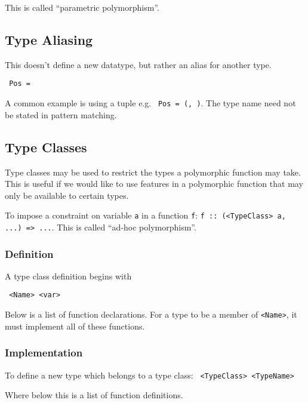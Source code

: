 This is called ``parametric polymorphism''.

\subsection{Type Aliasing}
This doesn't define a new datatype, but rather an alias for another type.
\begin{center}
  \texttt{ Pos = }
\end{center}

A common example is using a tuple e.g. \texttt{ Pos = (, )}. The type name need not be stated in pattern matching.

\subsection{Type Classes}
Type classes may be used to restrict the types a polymorphic function may take. This is useful if we would like to use features in a polymorphic function that may only be available to certain types.

To impose a constraint on variable \texttt{a} in a function \texttt{f}: \texttt{f :: (\texttt<TypeClass> a, ...) => ...}. This is called ``ad-hoc polymorphism''.

\subsubsection{Definition}
A type class definition begins with

\texttt{ <Name> <var> }

Below is a list of function declarations. For a type to be a member of \texttt{<Name>}, it must implement all of these functions.

\subsubsection{Implementation}
To define a new type which belongs to a type class:
\texttt{ <TypeClass> <TypeName> }

Where below this is a list of function definitions.

